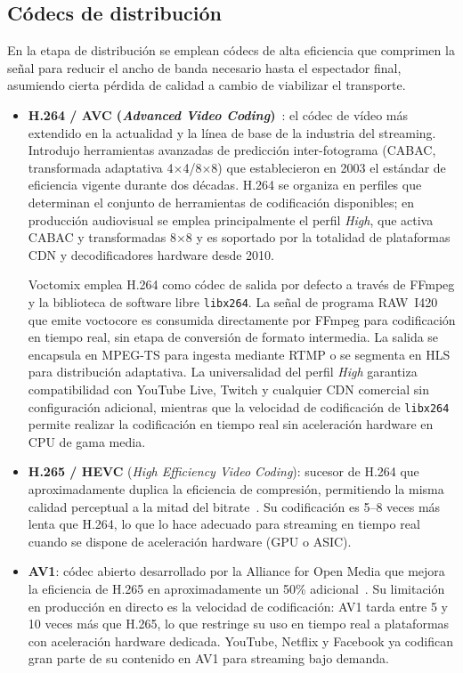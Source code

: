 \subsection{Códecs de distribución}

En la etapa de distribución se emplean códecs de alta eficiencia que comprimen la señal
para reducir el ancho de banda necesario hasta el espectador final, asumiendo cierta
pérdida de calidad a cambio de viabilizar el transporte.

\begin{itemize}
  \item \textbf{H.264 / AVC (\textit{Advanced Video Coding})}~\cite{itu_h264}:
  el códec de vídeo más extendido en la actualidad y la línea de base de la industria
  del streaming. Introdujo herramientas avanzadas de predicción inter-fotograma (CABAC,
  transformada adaptativa 4$\times$4/8$\times$8) que establecieron en 2003 el estándar
  de eficiencia vigente durante dos décadas. H.264 se organiza en perfiles que
  determinan el conjunto de herramientas de codificación disponibles; en producción
  audiovisual se emplea principalmente el perfil \textit{High}, que activa CABAC y
  transformadas 8$\times$8 y es soportado por la totalidad de plataformas CDN y
  decodificadores hardware desde 2010.

  Voctomix emplea H.264 como códec de salida por defecto a través de FFmpeg y la
  biblioteca de software libre \texttt{libx264}. La señal de programa RAW~I420 que
  emite voctocore es consumida directamente por FFmpeg para codificación en tiempo real,
  sin etapa de conversión de formato intermedia. La salida se encapsula en MPEG-TS para
  ingesta mediante RTMP o se segmenta en HLS para distribución adaptativa. La
  universalidad del perfil \textit{High} garantiza compatibilidad con YouTube Live,
  Twitch y cualquier CDN comercial sin configuración adicional, mientras que la
  velocidad de codificación de \texttt{libx264} permite realizar la codificación en
  tiempo real sin aceleración hardware en CPU de gama media.

  \item \textbf{H.265 / HEVC} (\textit{High Efficiency Video Coding}): sucesor de
  H.264 que aproximadamente duplica la eficiencia de compresión, permitiendo la misma
  calidad perceptual a la mitad del bitrate~\cite{itu_h265}. Su codificación es 5--8
  veces más lenta que H.264, lo que lo hace adecuado para streaming en tiempo real
  cuando se dispone de aceleración hardware (GPU o ASIC).

  \item \textbf{AV1}: códec abierto desarrollado por la Alliance for Open Media que
  mejora la eficiencia de H.265 en aproximadamente un 50\% adicional~\cite{chen2024_codec_comparison}.
  Su limitación en producción en directo es la velocidad de codificación: AV1 tarda
  entre 5 y 10 veces más que H.265, lo que restringe su uso en tiempo real a plataformas
  con aceleración hardware dedicada. YouTube, Netflix y Facebook ya codifican gran parte
  de su contenido en AV1 para streaming bajo demanda.


\end{itemize}
